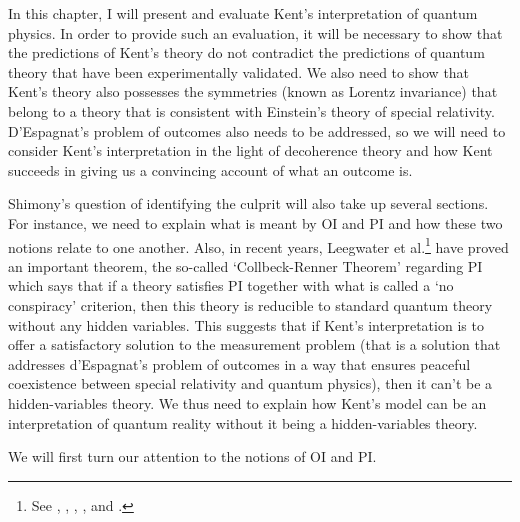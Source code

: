 In this chapter, I will present and evaluate Kent's interpretation of quantum physics. In order to provide such an evaluation, it will be necessary to show that the predictions of Kent's theory do not contradict the  predictions of quantum theory that have been experimentally validated. We also need to show that Kent's theory also possesses the symmetries (known as Lorentz invariance) that belong to a theory that is consistent with Einstein's theory of special relativity. D'Espagnat's problem of outcomes also needs to be addressed, so we will need to consider  Kent's interpretation in the light of decoherence theory and how Kent succeeds in giving us a convincing account of what an outcome is.

Shimony's question of identifying the culprit will also take up several sections. For instance, we need to explain what is meant by OI and PI and how these two notions relate to one another. Also, in recent years,  Leegwater et al.\footnote{See \cite{LeegwaterGijs2016Aitf}, \cite{ColbeckRoger2011Neoq}, \cite{ColbeckRoger2012Tcoq}, \cite{LandsmanK2015OtCt}, and \cite{Landsman}.} have  proved an important theorem, the so-called {`Collbeck-Renner Theorem'} regarding PI which says that if a theory satisfies PI together with what is called a {`no conspiracy'} criterion,\label{noconspiracy} then this theory is reducible to standard quantum theory without any hidden variables. This suggests that if Kent's interpretation is to offer a satisfactory solution to the measurement problem (that is a solution that addresses d'Espagnat's problem of outcomes in a way that  ensures peaceful coexistence between special relativity and quantum physics), then it can't be a hidden-variables theory. We thus need to explain how Kent's model can be an interpretation of quantum reality without it being a hidden-variables theory. 

We will first turn our attention to the notions of OI and PI.